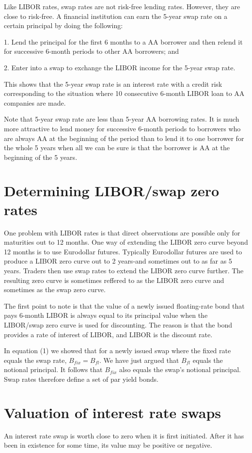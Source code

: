 \documentclass{article}
\begin{document}
Like LIBOR rates, swap rates are not risk-free lending rates. However, they are close to risk-free. A financial institution can earn the 5-year swap rate on a certain principal by doing the following:

1. Lend the principal for the first 6 months to a AA borrower and then relend it for successive 6-month periods to other AA borrowers; and

2. Enter into a swap to exchange the LIBOR income for the 5-year swap rate.

This shows that the 5-year swap rate is an interest rate with a credit risk corresponding to the situation where 10 consecutive 6-month LIBOR loan to AA companies are made.

Note that 5-year swap rate are less than 5-year AA borrowing rates. It is much more attractive to lend money for successive 6-month periods to borrowers who are always AA at the beginning of the period than to lend it to one borrower for the whole 5 years when all we can be sure is that the borrower is AA at the beginning of the 5 years.

\section{Determining LIBOR/swap zero rates}
One problem with LIBOR rates is that direct observations are possible only for maturities out to 12 months. One way of extending the LIBOR zero curve beyond 12 months is to use Eurodollar futures. Typically Eurodollar futures are used to produce a LIBOR zero curve out to 2 years-and sometimes out to as far as 5 years. Traders then use swap rates to extend the LIBOR zero curve further. The resulting zero curve is sometimes reffered to as the LIBOR zero curve and sometimes as the swap zero curve.

The first point to note is that the value of a newly issued floating-rate bond that pays 6-month LIBOR is always equal to its principal value when the LIBOR/swap zero curve is used for discounting. The reason is that the bond provides a rate of interest of LIBOR, and LIBOR is the discount rate.

In equation (1) we showed that for a newly issued swap where the fixed rate equals the swap rate, $ B_{fix}=B_{fl} $. We have just argued that $ B_{fl} $ equals the notional principal. It follows that $ B_{fix} $ also equals the swap's notional principal. Swap rates therefore define a set of par yield bonds.

\section{Valuation of interest rate swaps}
An interest rate swap is worth close to zero when it is first initiated. After it has been in existence for some time, its value may be positive or negative.
\end{document}
